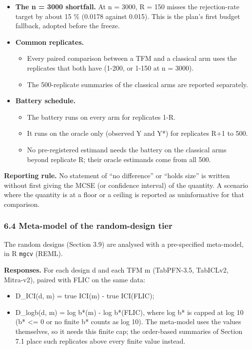 \documentclass[
  10pt,
]{article}
\providecommand{\tightlist}{%
  \setlength{\itemsep}{0pt}\setlength{\parskip}{0pt}}
\begin{document}
\begin{itemize}
\tightlist
\item
  \textbf{The n = 3000 shortfall.} At n = 3000, R = 150
  misses the rejection-rate target by about 15 \% (0.0178
  against 0.015). This is the plan's first budget fallback,
  adopted before the freeze.
\item
  \textbf{Common replicates.}

  \begin{itemize}
  \tightlist
  \item
    Every paired comparison between a TFM and a classical
    arm uses the replicates that both have (1-200, or 1-150
    at n = 3000).
  \item
    The 500-replicate summaries of the classical arms are
    reported separately.
  \end{itemize}
\item
  \textbf{Battery schedule.}

  \begin{itemize}
  \tightlist
  \item
    The battery runs on every arm for replicates 1-R.
  \item
    It runs on the oracle only (observed Y and Y*) for
    replicates R+1 to 500.
  \item
    No pre-registered estimand needs the battery on the
    classical arms beyond replicate R; their oracle
    estimands come from all 500.
  \end{itemize}
\end{itemize}

\textbf{Reporting rule.} No statement of ``no difference''
or ``holds size'' is written without first giving the MCSE
(or confidence interval) of the quantity. A scenario where
the quantity is at a floor or a ceiling is reported as
uninformative for that comparison.

\subsubsection{6.4 Meta-model of the random-design
tier}\label{meta-model-of-the-random-design-tier}

The random designs (Section 3.9) are analysed with a
pre-specified meta-model, in R \texttt{mgcv} (REML).

\textbf{Responses.} For each design d and each TFM m
(TabPFN-3.5, TabICLv2, Mitra-v2), paired with FLIC on the
same data:

\begin{itemize}
\tightlist
\item
  D\_ICI(d, m) = true ICI(m) - true ICI(FLIC);
\item
  D\_logb(d, m) = \textbar log b*(m)\textbar{} -
  \textbar log b*(FLIC)\textbar, where \textbar log
  b*\textbar{} is capped at log 10 (b* \textless= 0 or no
  finite b* counts as log 10). The meta-model uses the
  values themselves, so it needs this finite cap; the
  order-based summaries of Section 7.1 place such replicates
  above every finite value instead.
\end{itemize}
\end{document}
